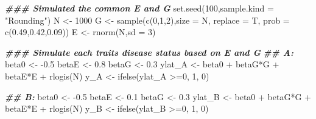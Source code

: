 \documentclass[
]{article}
\newenvironment{Shaded}{\begin{snugshade}}{\end{snugshade}}
\newcommand{\AttributeTok}[1]{\textcolor[rgb]{0.77,0.63,0.00}{#1}}
\newcommand{\DecValTok}[1]{\textcolor[rgb]{0.00,0.00,0.81}{#1}}
\newcommand{\DocumentationTok}[1]{\textcolor[rgb]{0.56,0.35,0.01}{\textbf{\textit{#1}}}}
\newcommand{\FloatTok}[1]{\textcolor[rgb]{0.00,0.00,0.81}{#1}}
\newcommand{\FunctionTok}[1]{\textcolor[rgb]{0.00,0.00,0.00}{#1}}
\newcommand{\NormalTok}[1]{#1}
\newcommand{\OtherTok}[1]{\textcolor[rgb]{0.56,0.35,0.01}{#1}}
\newcommand{\SpecialCharTok}[1]{\textcolor[rgb]{0.00,0.00,0.00}{#1}}
\newcommand{\StringTok}[1]{\textcolor[rgb]{0.31,0.60,0.02}{#1}}
\begin{document}
\begin{Shaded}
\begin{Highlighting}[]
\DocumentationTok{\#\#\# Simulated the common E and G}
\FunctionTok{set.seed}\NormalTok{(}\DecValTok{100}\NormalTok{,}\AttributeTok{sample.kind =} \StringTok{"Rounding"}\NormalTok{)}
\NormalTok{N }\OtherTok{\textless{}{-}} \DecValTok{1000}
\NormalTok{G }\OtherTok{\textless{}{-}} \FunctionTok{sample}\NormalTok{(}\FunctionTok{c}\NormalTok{(}\DecValTok{0}\NormalTok{,}\DecValTok{1}\NormalTok{,}\DecValTok{2}\NormalTok{),}\AttributeTok{size =}\NormalTok{ N, }\AttributeTok{replace =}\NormalTok{ T, }\AttributeTok{prob =} \FunctionTok{c}\NormalTok{(}\FloatTok{0.49}\NormalTok{,}\FloatTok{0.42}\NormalTok{,}\FloatTok{0.09}\NormalTok{))}
\NormalTok{E }\OtherTok{\textless{}{-}} \FunctionTok{rnorm}\NormalTok{(N,}\AttributeTok{sd =} \DecValTok{3}\NormalTok{)}


\DocumentationTok{\#\#\# Simulate each trait\textquotesingle{}s disease status based on E and G}
\DocumentationTok{\#\# A:}
\NormalTok{beta0 }\OtherTok{\textless{}{-}} \SpecialCharTok{{-}}\FloatTok{0.5}
\NormalTok{betaE }\OtherTok{\textless{}{-}} \FloatTok{0.8}
\NormalTok{betaG }\OtherTok{\textless{}{-}} \FloatTok{0.3}
\NormalTok{ylat\_A }\OtherTok{\textless{}{-}}\NormalTok{ beta0 }\SpecialCharTok{+}\NormalTok{ betaG}\SpecialCharTok{*}\NormalTok{G }\SpecialCharTok{+}\NormalTok{ betaE}\SpecialCharTok{*}\NormalTok{E }\SpecialCharTok{+} \FunctionTok{rlogis}\NormalTok{(N)}
\NormalTok{y\_A }\OtherTok{\textless{}{-}} \FunctionTok{ifelse}\NormalTok{(ylat\_A }\SpecialCharTok{\textgreater{}=}\DecValTok{0}\NormalTok{, }\DecValTok{1}\NormalTok{, }\DecValTok{0}\NormalTok{)}

\DocumentationTok{\#\# B:}
\NormalTok{beta0 }\OtherTok{\textless{}{-}} \SpecialCharTok{{-}}\FloatTok{0.5}
\NormalTok{betaE }\OtherTok{\textless{}{-}} \FloatTok{0.1}
\NormalTok{betaG }\OtherTok{\textless{}{-}} \FloatTok{0.3}
\NormalTok{ylat\_B }\OtherTok{\textless{}{-}}\NormalTok{ beta0 }\SpecialCharTok{+}\NormalTok{ betaG}\SpecialCharTok{*}\NormalTok{G }\SpecialCharTok{+}\NormalTok{ betaE}\SpecialCharTok{*}\NormalTok{E }\SpecialCharTok{+} \FunctionTok{rlogis}\NormalTok{(N)}
\NormalTok{y\_B }\OtherTok{\textless{}{-}} \FunctionTok{ifelse}\NormalTok{(ylat\_B }\SpecialCharTok{\textgreater{}=}\DecValTok{0}\NormalTok{, }\DecValTok{1}\NormalTok{, }\DecValTok{0}\NormalTok{)}




\end{Highlighting}
\end{Shaded}
\end{document}

